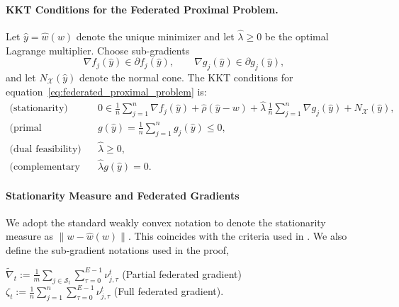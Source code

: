 \documentclass{article} %
\def\eqref#1{equation~\ref{#1}}
\def\S{{\mathcal S}}
\begin{document}
\paragraph{KKT Conditions for the Federated Proximal Problem.}
Let $\hat y=\hat w(w)$ denote the unique minimizer and let $\hat\lambda\ge 0$ be the optimal Lagrange multiplier.
Choose sub-gradients 
\[
\nabla f_j(\hat{y})\in\partial f_j(\hat y), \qquad 
\nabla g_j(\hat{y})\in\partial g_j(\hat y),
\]
and let $N_{\mathcal{X}}(\hat y)$ denote the normal cone.  
The KKT conditions for \eqref{eq:federated_proximal_problem} is:
\begin{align}
\text{(stationarity)} \quad 
& 0 \in 
    \frac{1}{n}\sum_{j=1}^n \nabla f_j(\hat{y})
    + \hat\rho(\hat y - w)
    + \hat\lambda\, \frac{1}{n}\sum_{j=1}^n \nabla g_j(\hat{y})
    + N_{\mathcal{X}}(\hat y),
    \label{eq:stat_federated}
    \\
\text{(primal feasibility)} \quad 
& g(\hat y)=\frac{1}{n}\sum_{j=1}^n g_j(\hat y) \le 0, 
\\
\text{(dual feasibility)} \quad
& \hat\lambda \ge 0,
\\
\text{(complementary slackness)} \quad
& \hat\lambda g(\hat y)=0.
\label{eq:comp_slackness}
\end{align}

\paragraph{Stationarity Measure and Federated Gradients}
We adopt the standard weakly convex notation to denote the stationarity measure as $\|w - \hat{w}(w)\|$. This coincides with the criteria used in \cite{huang2023oracle}. We also define the sub-gradient notations used in the proof,

$\tilde{\nabla}_t := \frac{1}{m} \sum_{j\in \S_t} \sum_{\tau=0}^{E-1} \nu_{j,\tau}^t$ (Partial federated gradient)
\\
$\zeta_t := \frac{1}{n} \sum_{j=1}^{n} \sum_{\tau=0}^{E-1} \nu_{j,\tau}^t$ (Full federated gradient).
\end{document}
